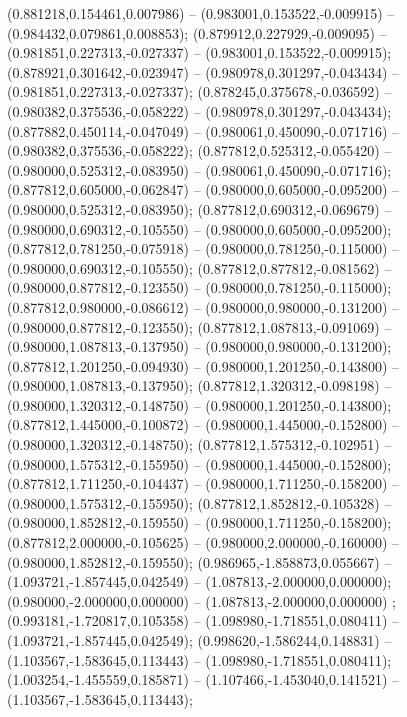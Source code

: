 (0.881218,0.154461,0.007986) -- (0.983001,0.153522,-0.009915) -- (0.984432,0.079861,0.008853);
 (0.879912,0.227929,-0.009095) -- (0.981851,0.227313,-0.027337) -- (0.983001,0.153522,-0.009915);
 (0.878921,0.301642,-0.023947) -- (0.980978,0.301297,-0.043434) -- (0.981851,0.227313,-0.027337);
 (0.878245,0.375678,-0.036592) -- (0.980382,0.375536,-0.058222) -- (0.980978,0.301297,-0.043434);
 (0.877882,0.450114,-0.047049) -- (0.980061,0.450090,-0.071716) -- (0.980382,0.375536,-0.058222);
 (0.877812,0.525312,-0.055420) -- (0.980000,0.525312,-0.083950) -- (0.980061,0.450090,-0.071716);
 (0.877812,0.605000,-0.062847) -- (0.980000,0.605000,-0.095200) -- (0.980000,0.525312,-0.083950);
 (0.877812,0.690312,-0.069679) -- (0.980000,0.690312,-0.105550) -- (0.980000,0.605000,-0.095200);
 (0.877812,0.781250,-0.075918) -- (0.980000,0.781250,-0.115000) -- (0.980000,0.690312,-0.105550);
 (0.877812,0.877812,-0.081562) -- (0.980000,0.877812,-0.123550) -- (0.980000,0.781250,-0.115000);
 (0.877812,0.980000,-0.086612) -- (0.980000,0.980000,-0.131200) -- (0.980000,0.877812,-0.123550);
 (0.877812,1.087813,-0.091069) -- (0.980000,1.087813,-0.137950) -- (0.980000,0.980000,-0.131200);
 (0.877812,1.201250,-0.094930) -- (0.980000,1.201250,-0.143800) -- (0.980000,1.087813,-0.137950);
 (0.877812,1.320312,-0.098198) -- (0.980000,1.320312,-0.148750) -- (0.980000,1.201250,-0.143800);
 (0.877812,1.445000,-0.100872) -- (0.980000,1.445000,-0.152800) -- (0.980000,1.320312,-0.148750);
 (0.877812,1.575312,-0.102951) -- (0.980000,1.575312,-0.155950) -- (0.980000,1.445000,-0.152800);
 (0.877812,1.711250,-0.104437) -- (0.980000,1.711250,-0.158200) -- (0.980000,1.575312,-0.155950);
 (0.877812,1.852812,-0.105328) -- (0.980000,1.852812,-0.159550) -- (0.980000,1.711250,-0.158200);
 (0.877812,2.000000,-0.105625) -- (0.980000,2.000000,-0.160000) -- (0.980000,1.852812,-0.159550);
 (0.986965,-1.858873,0.055667) -- (1.093721,-1.857445,0.042549) -- (1.087813,-2.000000,0.000000);
 (0.980000,-2.000000,0.000000) -- (1.087813,-2.000000,0.000000) ;
 (0.993181,-1.720817,0.105358) -- (1.098980,-1.718551,0.080411) -- (1.093721,-1.857445,0.042549);
 (0.998620,-1.586244,0.148831) -- (1.103567,-1.583645,0.113443) -- (1.098980,-1.718551,0.080411);
 (1.003254,-1.455559,0.185871) -- (1.107466,-1.453040,0.141521) -- (1.103567,-1.583645,0.113443);
